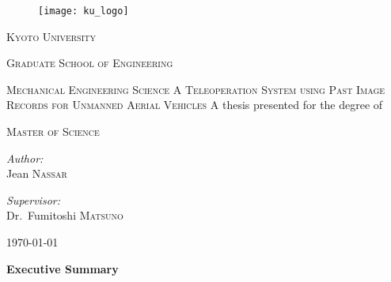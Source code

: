 \begin{titlepage}
  \begin{center}
    \noindent

    \begin{figure}[h]
      \centering
      \texttt{[image: ku\_logo]}
    \end{figure}
    \textsc{\LARGE Kyoto University}
    
    \textsc{\Large Graduate School of Engineering}

    \textsc{\large Mechanical Engineering Science}
    \vfill\vfill
    \textsc{\large A Teleoperation System using Past Image Records for Unmanned Aerial Vehicles}  %
    \vfill\vfill
    {\large A thesis presented for the degree of}

    \textsc{\large Master of Science}
    \vfill\vfill
    \begin{minipage}[t]{0.4\textwidth}
      \begin{flushleft}
	\emph{Author:}\\
	Jean \textsc{Nassar}
      \end{flushleft}
    \end{minipage}
    \begin{minipage}[t]{0.4\textwidth}
      \begin{flushright}
	\emph{Supervisor:}\\
	Dr.~Fumitoshi \textsc{Matsuno}
      \end{flushright}
    \end{minipage}
    \vfill
    \today
  \end{center}
\end{titlepage}


\thispagestyle{empty}
  \null{}
    \begin{flushright}
    \end{flushright}
  \null

\newcommand\summaryname{Executive Summary}
\newenvironment{summary}%
  {\cleardoublepage\thispagestyle{empty}%
    \null\vfill%
    \begin{center}%
      \bfseries \summaryname
    \end{center}}%
  \vfill\null
  \begin{summary}
    \lipsum[1-3]
  \end{summary}

